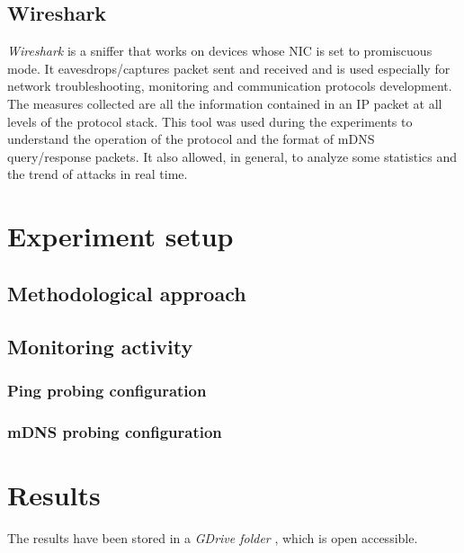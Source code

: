 \documentclass[fleqn, 11pt]{SelfArx} %
\begin{document}
\subsection{Wireshark}
\textit{Wireshark} is a sniffer that works on devices whose NIC is set to promiscuous mode. It eavesdrops/captures packet sent and received and is used especially for network troubleshooting, monitoring and communication protocols development. The measures collected are all the information contained in an IP packet at all levels of the protocol stack. \newline
This tool was used during the experiments to understand the operation of the protocol and the format of mDNS query/response packets. \newline
It also allowed, in general, to analyze some statistics and the trend of attacks in real time.

\section{Experiment setup}
\subsection{Methodological approach}
\subsection{Monitoring activity}
\subsubsection{Ping probing configuration}
\subsubsection{mDNS probing configuration}


\section{Results}
The results have been stored in a {\it{GDrive folder}} \cite{GDrive}, which is open accessible.
\end{document}

